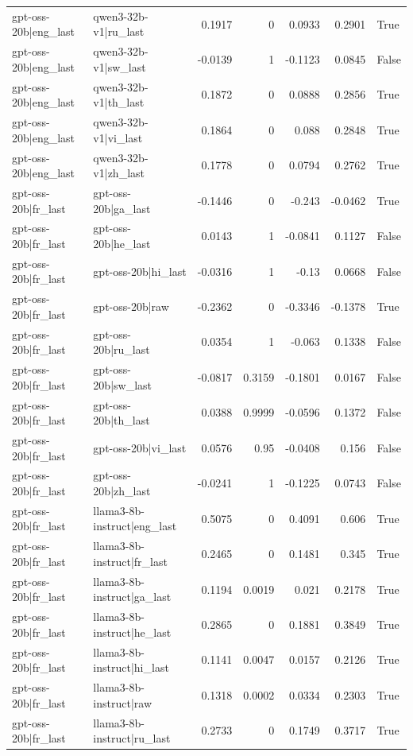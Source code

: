 \begin{table}
\begin{tabular}{l l r r r r l}
gpt-oss-20b|eng_last & qwen3-32b-v1|ru_last & 0.1917 & 0 & 0.0933 & 0.2901 & True \\
gpt-oss-20b|eng_last & qwen3-32b-v1|sw_last & -0.0139 & 1 & -0.1123 & 0.0845 & False \\
gpt-oss-20b|eng_last & qwen3-32b-v1|th_last & 0.1872 & 0 & 0.0888 & 0.2856 & True \\
gpt-oss-20b|eng_last & qwen3-32b-v1|vi_last & 0.1864 & 0 & 0.088 & 0.2848 & True \\
gpt-oss-20b|eng_last & qwen3-32b-v1|zh_last & 0.1778 & 0 & 0.0794 & 0.2762 & True \\
gpt-oss-20b|fr_last & gpt-oss-20b|ga_last & -0.1446 & 0 & -0.243 & -0.0462 & True \\
gpt-oss-20b|fr_last & gpt-oss-20b|he_last & 0.0143 & 1 & -0.0841 & 0.1127 & False \\
gpt-oss-20b|fr_last & gpt-oss-20b|hi_last & -0.0316 & 1 & -0.13 & 0.0668 & False \\
gpt-oss-20b|fr_last & gpt-oss-20b|raw & -0.2362 & 0 & -0.3346 & -0.1378 & True \\
gpt-oss-20b|fr_last & gpt-oss-20b|ru_last & 0.0354 & 1 & -0.063 & 0.1338 & False \\
gpt-oss-20b|fr_last & gpt-oss-20b|sw_last & -0.0817 & 0.3159 & -0.1801 & 0.0167 & False \\
gpt-oss-20b|fr_last & gpt-oss-20b|th_last & 0.0388 & 0.9999 & -0.0596 & 0.1372 & False \\
gpt-oss-20b|fr_last & gpt-oss-20b|vi_last & 0.0576 & 0.95 & -0.0408 & 0.156 & False \\
gpt-oss-20b|fr_last & gpt-oss-20b|zh_last & -0.0241 & 1 & -0.1225 & 0.0743 & False \\
gpt-oss-20b|fr_last & llama3-8b-instruct|eng_last & 0.5075 & 0 & 0.4091 & 0.606 & True \\
gpt-oss-20b|fr_last & llama3-8b-instruct|fr_last & 0.2465 & 0 & 0.1481 & 0.345 & True \\
gpt-oss-20b|fr_last & llama3-8b-instruct|ga_last & 0.1194 & 0.0019 & 0.021 & 0.2178 & True \\
gpt-oss-20b|fr_last & llama3-8b-instruct|he_last & 0.2865 & 0 & 0.1881 & 0.3849 & True \\
gpt-oss-20b|fr_last & llama3-8b-instruct|hi_last & 0.1141 & 0.0047 & 0.0157 & 0.2126 & True \\
gpt-oss-20b|fr_last & llama3-8b-instruct|raw & 0.1318 & 0.0002 & 0.0334 & 0.2303 & True \\
gpt-oss-20b|fr_last & llama3-8b-instruct|ru_last & 0.2733 & 0 & 0.1749 & 0.3717 & True \\

\end{tabular}
\end{table}
